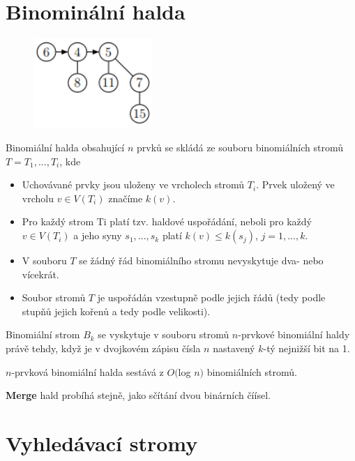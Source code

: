 \documentclass{szzclass}
\begin{document}
\newpage

\section{Binominální halda}

\begin{figure}[h]
\centering
\includegraphics[width=0.4\textwidth]{topics/bi-spol-5/images/binominal-heap.png}
\end{figure}

Binomiální halda obsahující $n$ prvků se skládá ze souboru
binomiálních stromů $T = T_1, . . . , T_i$, kde
\begin{itemize}
    \item Uchovávané prvky jsou uloženy ve vrcholech stromů $T_i$.
    Prvek uložený ve vrcholu $v \in V(T_i)$ značíme $k(v)$.
    \item  Pro každý strom Ti platí tzv. haldové uspořádání, neboli pro
    každý $v \in V(T_i)$ a jeho syny $s_1, . . . , s_k$ platí $k(v) \leq k(s_j)$,
    $j = 1, . . . , k$.
    \item V souboru $T$ se žádný řád binomiálního stromu nevyskytuje
    dva- nebo vícekrát.
    \item Soubor stromů $T$ je uspořádán vzestupně podle jejich řádů
    (tedy podle stupňů jejich kořenů a tedy podle velikosti).
\end{itemize}

Binomiální strom $B_k$ se vyskytuje v souboru stromů $n$-prvkové
binomiální haldy právě tehdy, když je v dvojkovém zápisu čísla $n$
nastavený $k$-tý nejnižší bit na 1.

$n$-prvková binomiální halda sestává z $O($log $n)$ binomiálních stromů.

\textbf{Merge} hald probíhá stejně, jako sčítání dvou binárních číísel.


\newpage

\section{Vyhledávací stromy}
\end{document}

